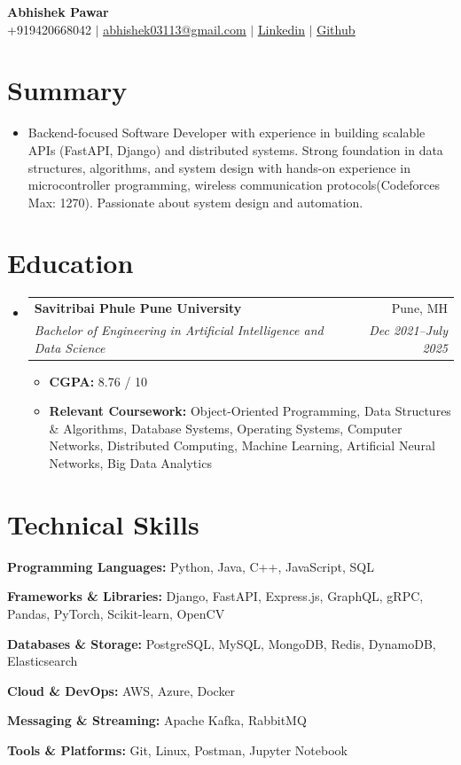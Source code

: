 \documentclass[letterpaper,11pt]{article}
\makeatletter
\newcommand{\resumeItem}[1]{
  \item\small{
    {#1 \vspace{-2pt}}
  }
}
\newcommand{\resumeSubheading}[4]{
  \vspace{-2pt}\item
  \begin{tabular*}{0.97\textwidth}[t]{l@{\extracolsep{\fill}}r}
    \textbf{#1} & #2 \\
    \textit{\small#3} & \textit{\small #4} \\
  \end{tabular*}\vspace{-7pt}
}
\newcommand{\resumeSubHeadingListStart}{\begin{itemize}[leftmargin=0.15in,
      label={}]}
\newcommand{\resumeSubHeadingListEnd}{\end{itemize}}
\newcommand{\resumeItemListStart}{\begin{itemize}}
\newcommand{\resumeItemListEnd}{\end{itemize}\vspace{-5pt}}
\makeatother
\begin{document}
\begin{center}
  \textbf{\Huge Abhishek Pawar} \\ \vspace{2pt}
  \small +919420668042 $|$
  \href{mailto:abhishek03113@gmail.com}{\underline{abhishek03113@gmail.com}}
  $|$
  \href{https://www.linkedin.com/in/abhishekpawar3113/}{\underline{Linkedin}}
  $|$
  \href{github.com/abhishek-03113}{\underline{Github}}
\end{center}

\section{Summary}
\resumeSubHeadingListStart
\resumeItem{Backend-focused Software Developer with experience in building
  scalable APIs (FastAPI, Django) and distributed systems. Strong
foundation in data structures, algorithms, and system design with hands-on experience in microcontroller programming,
wireless communication protocols(Codeforces Max: 1270). Passionate about
  system
  design and automation.}

\resumeSubHeadingListEnd

\section{Education}
\resumeSubHeadingListStart
\resumeSubheading
{Savitribai Phule Pune University}{Pune, MH}
{Bachelor of Engineering in Artificial Intelligence and Data Science}{Dec
  2021--July 2025}
\resumeItemListStart
\resumeItem{\textbf{CGPA:} 8.76 / 10}
\resumeItem{\textbf{Relevant Coursework:} Object-Oriented Programming,
  Data Structures \& Algorithms, Database Systems, Operating Systems, Computer
  Networks, Distributed Computing, Machine Learning, Artificial Neural
  Networks,
  Big Data Analytics}
\resumeItemListEnd
\resumeSubHeadingListEnd

\section{Technical Skills}
\begin{itemize}[leftmargin=0.15in, label={}]
  \small{
  \item \textbf{Programming Languages:} Python, Java, C++, JavaScript, SQL
  \item \textbf{Frameworks \& Libraries:} Django, FastAPI, Express.js, GraphQL,
        gRPC, Pandas, PyTorch, Scikit-learn, OpenCV
  \item \textbf{Databases \& Storage:} PostgreSQL, MySQL, MongoDB, Redis,
        DynamoDB, Elasticsearch
  \item \textbf{Cloud \& DevOps:} AWS, Azure, Docker
  \item \textbf{Messaging \& Streaming:} Apache Kafka, RabbitMQ
  \item \textbf{Tools \& Platforms:} Git, Linux, Postman, Jupyter Notebook
        }
\end{itemize}
\end{document}
